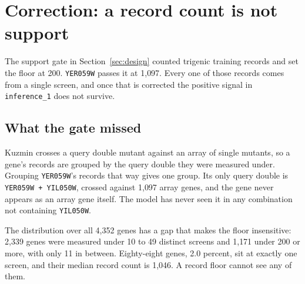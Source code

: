 
\section{Correction: a record count is not support}\label{sec:screens}

The support gate in Section~\ref{sec:design} counted trigenic training records
and set the floor
at 200. \texttt{YER059W} passes it at 1{,}097. Every one of those records comes
from a single screen, and once that is corrected the positive signal in
\texttt{inference\_1} does not survive.

\subsection{What the gate missed}

Kuzmin crosses a query double mutant against an array of single mutants, so a
gene's records are grouped by the query double they were measured under. Grouping
\texttt{YER059W}'s records that way gives one group. Its only query double is
\texttt{YER059W + YIL050W}, crossed against 1{,}097 array genes, and the gene
never appears as an array gene itself. The model has never seen it in any
combination not containing \texttt{YIL050W}.

The distribution over all 4{,}352 genes has a gap that makes the floor
insensitive: 2{,}339 genes were measured under 10 to 49 distinct screens and
1{,}171 under 200 or more, with only 11 in between. Eighty-eight genes, 2.0
percent, sit at exactly one screen, and their median record count is 1{,}046. A
record floor cannot see any of them.

